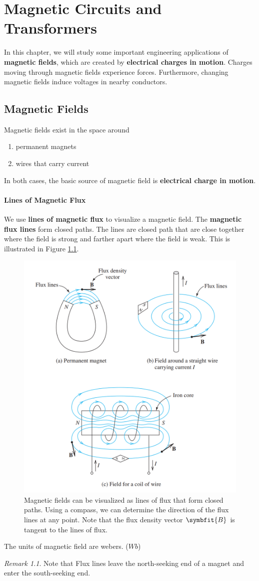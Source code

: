 \documentclass[math,code]{amznotes}
\theoremstyle{remark}
\newtheorem*{remark}{Remark}
\begin{document}
\tableofcontents

\chapter{Magnetic Circuits and Transformers}
In this chapter, we will study some important engineering applications of \textbf{magnetic fields}, which are created by \textbf{electrical charges in motion}. Charges moving through magnetic fields experience forces. Furthermore, changing magnetic fields induce voltages in nearby conductors.

\section{Magnetic Fields}
Magnetic fields exist in the space around
\begin{enumerate}
    \item permanent magnets
    \item wires that carry current
\end{enumerate}
In both cases, the basic source of magnetic field is \textbf{electrical charge in motion}.
\subsubsection{Lines of Magnetic Flux}
We use \textbf{lines of magnetic flux} to visualize a magnetic field. The \textbf{magnetic flux lines} form closed paths. The lines are closed path that are close together where the field is strong and farther apart where the field is weak. This is illustrated in Figure \ref{fig:magnetic-fields-lines}.
\begin{figure}[H]
    \centering
    \includegraphics[width=0.4\linewidth]{images/magnetic-fields-lines.png}
    \caption{Magnetic fields can be visualized as lines of flux that form closed paths. Using a compass, we can determine the direction of the flux lines at any point. Note that the flux density vector $\symbfit{B}$ is tangent to the lines of flux.}
    \label{fig:magnetic-fields-lines}
\end{figure}
The units of magnetic field are webers. ($Wb$)
\begin{notebox}
    \begin{remark}
        Note that Flux lines leave the north-seeking end of a magnet and enter the south-seeking end.
    \end{remark}
\end{notebox}
\end{document}
